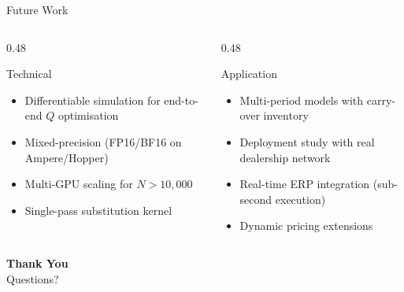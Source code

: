 \documentclass[aspectratio=169, 11pt]{beamer}
\begin{document}
\begin{frame}{Future Work}
\begin{columns}[T]
\begin{column}{0.48\textwidth}
\begin{block}{Technical}
\begin{itemize}
    \item Differentiable simulation for end-to-end $Q$ optimisation
    \item Mixed-precision (FP16/BF16 on Ampere/Hopper)
    \item Multi-GPU scaling for $N > 10{,}000$
    \item Single-pass substitution kernel
\end{itemize}
\end{block}
\end{column}
\begin{column}{0.48\textwidth}
\begin{block}{Application}
\begin{itemize}
    \item Multi-period models with carry-over inventory
    \item Deployment study with real dealership network
    \item Real-time ERP integration (sub-second execution)
    \item Dynamic pricing extensions
\end{itemize}
\end{block}
\end{column}
\end{columns}

\vspace{0.8em}
\begin{center}
\large\textbf{Thank You}\\[0.3em]
\normalsize Questions?
\end{center}
\end{frame}
\end{document}
